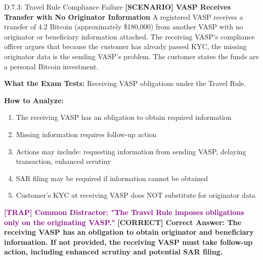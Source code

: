 \documentclass[11pt,a4paper]{beamer}
\newcommand{\trap}[1]{\textcolor{purple}{\textbf{[TRAP] #1}}}
\newcommand{\correct}[1]{\textcolor{green!50!black}{\textbf{[CORRECT] #1}}}
\newcommand{\scenario}[1]{\textcolor{blue!70!black}{\textbf{[SCENARIO] #1}}}
\begin{document}
\begin{frame}{D.7.3: Travel Rule Compliance Failure}
	\scenario{VASP Receives Transfer with No Originator Information}
	A registered VASP receives a transfer of 4.2 Bitcoin (approximately \$180,000) from another VASP with no originator or beneficiary information attached. The receiving VASP's compliance officer argues that because the customer has already passed KYC, the missing originator data is the sending VASP's problem. The customer states the funds are a personal Bitcoin investment.
	
	\vspace{0.1cm}
	\textbf{What the Exam Tests:} Receiving VASP obligations under the Travel Rule.
	
	\vspace{0.1cm}
	\textbf{How to Analyze:}
	\begin{enumerate}
		\item The receiving VASP has an obligation to obtain required information
		\item Missing information requires follow-up action
		\item Actions may include: requesting information from sending VASP, delaying transaction, enhanced scrutiny
		\item SAR filing may be required if information cannot be obtained
		\item Customer's KYC at receiving VASP does NOT substitute for originator data
	\end{enumerate}
	
	\trap{Common Distractor: "The Travel Rule imposes obligations only on the originating VASP."}
	\correct{Correct Answer: The receiving VASP has an obligation to obtain originator and beneficiary information. If not provided, the receiving VASP must take follow-up action, including enhanced scrutiny and potential SAR filing.}
\end{frame}
\end{document}
